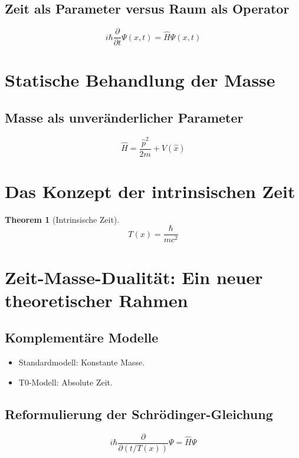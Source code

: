 \documentclass[12pt,a4paper]{article}
\newcommand{\Tfield}{T(x)}
\newtheorem{theorem}{Theorem}[section]
\begin{document}
	\subsection{Zeit als Parameter versus Raum als Operator}
	\begin{equation}
		i\hbar \frac{\partial}{\partial t}\Psi(x,t) = \hat{H}\Psi(x,t)
	\end{equation}
	
	\section{Statische Behandlung der Masse}
	\subsection{Masse als unveränderlicher Parameter}
	\begin{equation}
		\hat{H} = \frac{\hat{p}^2}{2m} + V(\hat{x})
	\end{equation}
	
	\section{Das Konzept der intrinsischen Zeit}
	\begin{theorem}[Intrinsische Zeit]
		\begin{equation}
			\Tfield = \frac{\hbar}{mc^2}
		\end{equation}
	\end{theorem}
	
	\section{Zeit-Masse-Dualität: Ein neuer theoretischer Rahmen}
	\subsection{Komplementäre Modelle}
	\begin{itemize}
		\item Standardmodell: Konstante Masse.
		\item T0-Modell: Absolute Zeit.
	\end{itemize}
	
	\subsection{Reformulierung der Schrödinger-Gleichung}
	\begin{equation}
		i\hbar \frac{\partial}{\partial (t/\Tfield)}\Psi = \hat{H}\Psi
	\end{equation}
	
\end{document}
